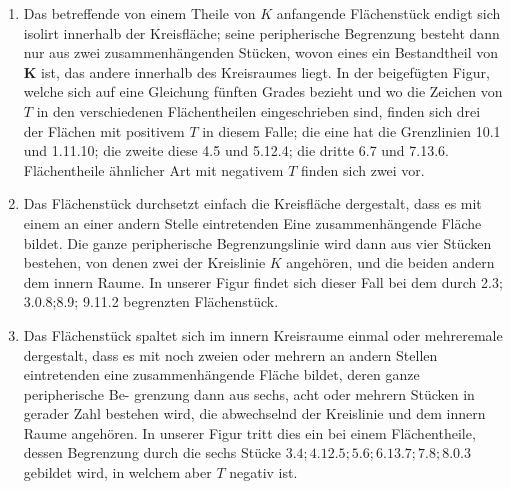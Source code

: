 \documentclass[10pt]{article}
\begin{document}
\begin{enumerate}
  \item Das betreffende von einem Theile von \(K\) anfangende Flächenstück endigt sich isolirt innerhalb der Kreisfläche; seine peripherische Begrenzung besteht dann nur aus zwei zusammenhängenden Stücken, wovon eines ein Bestandtheil von \(\boldsymbol{K}\) ist, das andere innerhalb des Kreisraumes liegt. In der beigefügten Figur, welche sich auf eine Gleichung fünften Grades bezieht und wo die Zeichen von \(T\) in den verschiedenen Flächentheilen eingeschrieben sind, finden sich drei der Flächen mit positivem \(T\) in diesem Falle; die eine hat die Grenzlinien 10.1 und 1.11.10; die zweite diese 4.5 und 5.12.4; die dritte 6.7 und 7.13.6. Flächentheile ähnlicher Art mit negativem \(T\) finden sich zwei vor.

  \item Das Flächenstück durchsetzt einfach die Kreisfläche dergestalt, dass es mit einem an einer andern Stelle eintretenden Eine zusammenhängende Fläche bildet. Die ganze peripherische Begrenzungslinie wird dann aus vier Stücken bestehen, von denen zwei der Kreislinie \(K\) angehören, und die beiden andern dem innern Raume. In unserer Figur findet sich dieser Fall bei dem durch 2.3; 3.0.8;8.9; 9.11.2 begrenzten Flächenstück.

  \item Das Flächenstück spaltet sich im innern Kreisraume einmal oder mehreremale dergestalt, dass es mit noch zweien oder mehrern an andern Stellen eintretenden eine zusammenhängende Fläche bildet, deren ganze peripherische Be-
grenzung dann aus sechs, acht oder mehrern Stücken in gerader Zahl bestehen wird, die abwechselnd der Kreislinie und dem innern Raume angehören. In unserer Figur tritt dies ein bei einem Flächentheile, dessen Begrenzung durch die sechs Stücke \(3.4 ; 4.12 .5 ; 5.6 ; 6.13 .7 ; 7.8 ; 8.0 .3\) gebildet wird, in welchem aber \(T\) negativ ist.

\end{enumerate}
\end{document}
